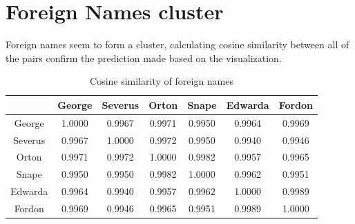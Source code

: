\documentclass{article}
\begin{document}
  \section{Foreign Names cluster}
  Foreign names seem to form a cluster, calculating cosine similarity between
  all of the pairs confirm the prediction made based on the visualization.

  \begin{table}[ht]
  \center
    \begin{tabular}{|c|c|c|c|c|c|c|}
    \hline
     & George & Severus & Orton & Snape & Edwarda & Fordon \\ \hline
    George & 1.0000 & 0.9967 & 0.9971 & 0.9950 & 0.9964 & 0.9969 \\ \hline
    Severus & 0.9967 & 1.0000 & 0.9972 & 0.9950 & 0.9940 & 0.9946 \\ \hline
    Orton & 0.9971 & 0.9972 & 1.0000 & 0.9982 & 0.9957 & 0.9965 \\ \hline
    Snape & 0.9950 & 0.9950 & 0.9982 & 1.0000 & 0.9962 & 0.9951 \\ \hline
    Edwarda & 0.9964 & 0.9940 & 0.9957 & 0.9962 & 1.0000 & 0.9989 \\ \hline
    Fordon & 0.9969 & 0.9946 & 0.9965 & 0.9951 & 0.9989 & 1.0000 \\ \hline
    \end{tabular}
  \caption{Cosine similarity of foreign names}
  \label{tab:foreign_names}
  \end{table}
\end{document}
